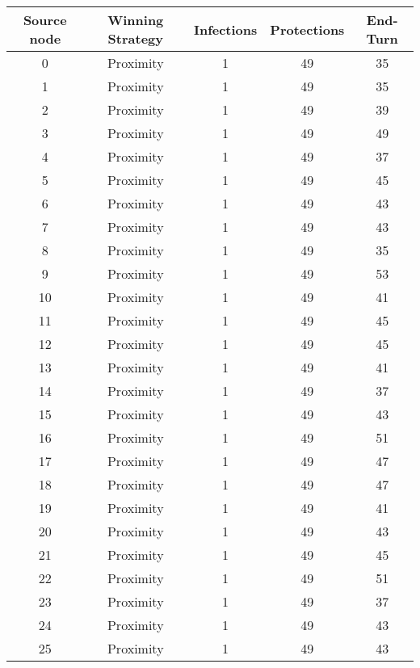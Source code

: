 \documentclass[results.tex]{subfiles}
\begin{document}
\begin{center}
  \begin{tabular}{| c || c | c | c | c |}
    \hline
    {\bfseries Source node} & {\bfseries Winning Strategy} & {\bfseries Infections} & {\bfseries Protections} & {\bfseries End-Turn} \\  %
    \hline\hline
    0 & Proximity & 1 & 49 & 35 \\ 
    \hline
    1 & Proximity & 1 & 49 & 35 \\ 
    \hline
    2 & Proximity & 1 & 49 & 39 \\ 
    \hline
    3 & Proximity & 1 & 49 & 49 \\ 
    \hline
    4 & Proximity & 1 & 49 & 37 \\ 
    \hline
    5 & Proximity & 1 & 49 & 45 \\ 
    \hline
    6 & Proximity & 1 & 49 & 43 \\ 
    \hline
    7 & Proximity & 1 & 49 & 43 \\ 
    \hline
    8 & Proximity & 1 & 49 & 35 \\ 
    \hline
    9 & Proximity & 1 & 49 & 53 \\ 
    \hline
    10 & Proximity & 1 & 49 & 41 \\ 
    \hline
    11 & Proximity & 1 & 49 & 45 \\ 
    \hline
    12 & Proximity & 1 & 49 & 45 \\ 
    \hline
    13 & Proximity & 1 & 49 & 41 \\ 
    \hline
    14 & Proximity & 1 & 49 & 37 \\ 
    \hline
    15 & Proximity & 1 & 49 & 43 \\ 
    \hline
    16 & Proximity & 1 & 49 & 51 \\ 
    \hline
    17 & Proximity & 1 & 49 & 47 \\ 
    \hline
    18 & Proximity & 1 & 49 & 47 \\ 
    \hline
    19 & Proximity & 1 & 49 & 41 \\ 
    \hline
    20 & Proximity & 1 & 49 & 43 \\ 
    \hline
    21 & Proximity & 1 & 49 & 45 \\ 
    \hline
    22 & Proximity & 1 & 49 & 51 \\ 
    \hline
    23 & Proximity & 1 & 49 & 37 \\ 
    \hline
    24 & Proximity & 1 & 49 & 43 \\ 
    \hline
    25 & Proximity & 1 & 49 & 43 \\ 

\end{tabular}
\end{center}
\end{document}
